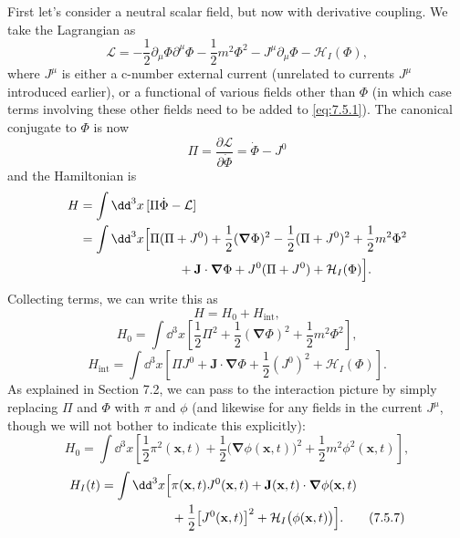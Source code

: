 First let's consider a neutral scalar field, but now with derivative coupling.
We take the Lagrangian as
\begin{equation}
\mathcal L=-\frac12\partial_\mu\Phi\partial^\mu\Phi
-\frac12m^2\Phi^2-J^\mu\partial_\mu\Phi-\mathcal H_I(\Phi),
\tag{7.5.1}\label{eq:7.5.1}
\end{equation}
where $J^\mu$ is either a c-number external current (unrelated to currents
$J^\mu$ introduced earlier), or a functional of various fields other than
$\Phi$ (in which case terms involving these other fields need to be added to
\eqref{eq:7.5.1}). The canonical conjugate to $\Phi$ is now
\begin{equation}
\Pi=\frac{\partial\mathcal L}{\partial\dot\Phi}=\dot\Phi-J^0
\tag{7.5.2}\label{eq:7.5.2}
\end{equation}
and the Hamiltonian is
\begin{align*}
H&=\int \dd^3x\,[\Pi\dot\Phi-\mathcal L]\notag\\
&=\int \dd^3x\Bigl[\Pi(\Pi+J^0)+\frac12(\boldsymbol\nabla\Phi)^2
-\frac12(\Pi+J^0)^2+\frac12m^2\Phi^2\notag\\
&\hspace{7.8em}{}+\mathbf J\cdot\boldsymbol\nabla\Phi
+J^0(\Pi+J^0)+\mathcal H_I(\Phi)\Bigr].
\end{align*}
Collecting terms, we can write this as
\begin{equation}
H=H_0+H_{\mathrm{int}},
\tag{7.5.3}\label{eq:7.5.3}
\end{equation}
\begin{equation}
H_0=\int \dd^3x\left[\frac12\Pi^2+\frac12(\boldsymbol\nabla\Phi)^2
+\frac12m^2\Phi^2\right],
\tag{7.5.4}\label{eq:7.5.4}
\end{equation}
\begin{equation}
H_{\mathrm{int}}=\int \dd^3x\left[\Pi J^0+\mathbf J\cdot\boldsymbol\nabla\Phi
+\frac12(J^0)^2+\mathcal H_I(\Phi)\right].
\tag{7.5.5}\label{eq:7.5.5}
\end{equation}
As explained in Section 7.2, we can pass to the interaction picture by
simply replacing $\Pi$ and $\Phi$ with $\pi$ and $\phi$ (and likewise for any
fields in the current $J^\mu$, though we will not bother to indicate this
explicitly):
\begin{equation}
H_0=\int \dd^3x\left[\frac12\pi^2(\mathbf x,t)
+\frac12\bigl(\boldsymbol\nabla\phi(\mathbf x,t)\bigr)^2
+\frac12m^2\phi^2(\mathbf x,t)\right],
\tag{7.5.6}\label{eq:7.5.6}
\end{equation}
\begin{align}
H_I(t)=\int \dd^3x\Bigl[&\pi(\mathbf x,t)J^0(\mathbf x,t)
+\mathbf J(\mathbf x,t)\cdot\boldsymbol\nabla\phi(\mathbf x,t)\notag\\
&+\frac12\bigl[J^0(\mathbf x,t)\bigr]^2
+\mathcal H_I\bigl(\phi(\mathbf x,t)\bigr)\Bigr].
\tag{7.5.7}\label{eq:7.5.7}
\end{align}
